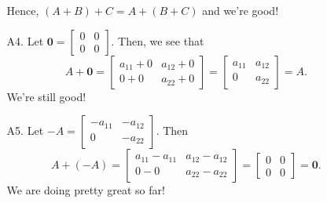 \documentclass[12pt]{article}
\begin{document}
\begin{enumerate}
\begin{enumerate}
\[						\]
					Hence, $(A + B) + C = A + (B + C)$ and we're good!
					\item[A4.] Let $\mathbf{0} = \begin{bmatrix} 0 & 0 \\ 0 & 0 \end{bmatrix}$. Then, we see that
						\[
							A + \mathbf{0} = \begin{bmatrix} a_{11} + 0 & a_{12} + 0 \\ 0 + 0 & a_{22} + 0 \end{bmatrix} = \begin{bmatrix} a_{11} & a_{12} \\ 0 & a_{22} \end{bmatrix} = A .
						\]
					We're still good!
					\item[A5.] Let $-A = \begin{bmatrix} -a_{11} & -a_{12} \\ 0 & -a_{22} \end{bmatrix}$. Then
						\[
							A + (-A) = \begin{bmatrix} a_{11} - a_{11} & a_{12} - a_{12} \\ 0 - 0 & a_{22} - a_{22} \end{bmatrix} = \begin{bmatrix} 0 & 0 \\ 0 & 0 \end{bmatrix} = \mathbf{0} .
						\]
					We are doing pretty great so far!
			\end{enumerate}


\end{enumerate}
\end{document}
